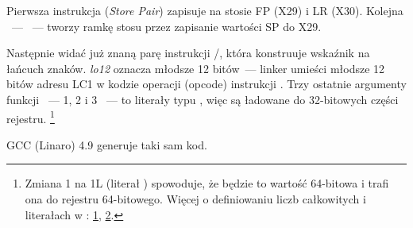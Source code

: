 


Pierwsza instrukcja  (\emph{Store Pair}) zapisuje na stosie \ac{FP} (X29) i \ac{LR} (X30).
Kolejna ~---  ~--- tworzy ramkę stosu przez zapisanie wartości \ac{SP} do X29.

Następnie widać już znaną parę instrukcji /\ADD, która konstruuje wskaźnik na łańcuch znaków.
\emph{lo12} oznacza młodsze 12 bitów~--- linker umieści młodsze 12 bitów adresu LC1 w kodzie operacji (opcode) instrukcji \ADD. Trzy ostatnie argumenty funkcji \printf ~--- 1, 2 i 3 ~--- to literały typu \Tint, więc są ładowane do 32-bitowych części rejestru.
\footnote{Zmiana 1 na 1L (literał ) spowoduje, że będzie to wartość 64-bitowa i trafi ona do rejestru 64-bitowego.
Więcej o definiowaniu liczb całkowitych i literałach w \CCpp:
\href{https://en.cppreference.com/w/c/language/integer_constant}{1},
\href{https://en.cppreference.com/w/cpp/language/integer_literal}{2}.}

\Optimizing GCC (Linaro) 4.9 generuje taki sam kod.

